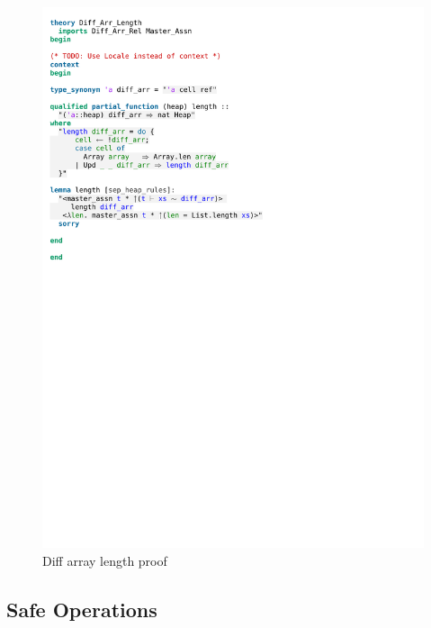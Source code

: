 \begin{figure}[htpb]
    \includegraphics[trim={0 18cm 0 9,8cm}, clip, width=1.00\textwidth]{figures/Theory_Diff_Arr_Length.pdf}
    \caption[Diff array length proof]{Diff array length proof}
    \label{fig:diff_arr_length_proof}
\end{figure}

\subsection{Safe Operations}\label{section:safe_diff_arr}

